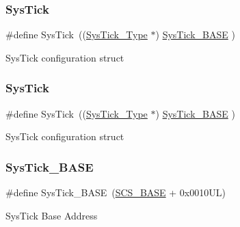 \subsubsection{\texorpdfstring{Sys\+Tick}{SysTick}\hspace{0.1cm}{\footnotesize\ttfamily [11/12]}}
{\footnotesize\ttfamily \#define Sys\+Tick~((\hyperlink{struct_sys_tick___type}{Sys\+Tick\+\_\+\+Type}   $\ast$)     \hyperlink{group___c_m_s_i_s__core__base_ga58effaac0b93006b756d33209e814646}{Sys\+Tick\+\_\+\+B\+A\+SE}     )}

Sys\+Tick configuration struct \mbox{\label{group___c_m_s_i_s__core__base_gacd96c53beeaff8f603fcda425eb295de}} 
\subsubsection{\texorpdfstring{Sys\+Tick}{SysTick}\hspace{0.1cm}{\footnotesize\ttfamily [12/12]}}
{\footnotesize\ttfamily \#define Sys\+Tick~((\hyperlink{struct_sys_tick___type}{Sys\+Tick\+\_\+\+Type}   $\ast$)     \hyperlink{group___c_m_s_i_s__core__base_ga58effaac0b93006b756d33209e814646}{Sys\+Tick\+\_\+\+B\+A\+SE}     )}

Sys\+Tick configuration struct \mbox{\label{group___c_m_s_i_s__core__base_ga58effaac0b93006b756d33209e814646}} 
\subsubsection{\texorpdfstring{Sys\+Tick\+\_\+\+B\+A\+SE}{SysTick\_BASE}\hspace{0.1cm}{\footnotesize\ttfamily [1/12]}}
{\footnotesize\ttfamily \#define Sys\+Tick\+\_\+\+B\+A\+SE~(\hyperlink{group___c_m_s_i_s__core__base_ga3c14ed93192c8d9143322bbf77ebf770}{S\+C\+S\+\_\+\+B\+A\+SE} +  0x0010\+U\+L)}

Sys\+Tick Base Address \mbox{\label{group___c_m_s_i_s__core__base_ga58effaac0b93006b756d33209e814646}} 

